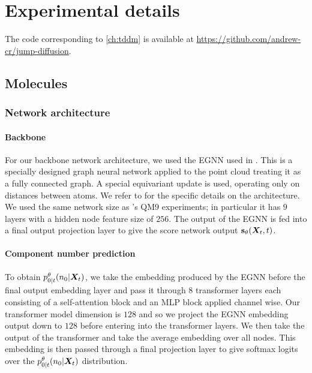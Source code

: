 \section{Experimental details}
\label{sec:tddm-ExperimentDetails}
The code corresponding to \cref{ch:tddm} is available at \url{https://github.com/andrew-cr/jump-diffusion}.

\subsection{Molecules}

\subsubsection{Network architecture}
\paragraph{Backbone}
For our backbone network architecture, we used the EGNN used in \citet{hoogeboom2022equivariant}. This is a specially designed graph neural network applied to the point cloud treating it as a fully connected graph. A special equivariant update is used, operating only on distances between atoms. We refer to \citet{hoogeboom2022equivariant} for the specific details on the architecture. We used the same network size as \citet{hoogeboom2022equivariant}'s QM9 experiments; in particular it has $9$ layers with a hidden node feature size of $256$. The output of the EGNN is fed into a final output projection layer to give the score network output ${\mathbf{s}}_\theta({\bm{X}}_t, t)$.

\paragraph{Component number prediction}
To obtain $p_{0|t}^\theta(n_0 | {\bm{X}}_t)$,  we take the embedding produced by the EGNN before the final output embedding layer and pass it through 8 transformer layers each consisting of a self-attention block and an MLP block applied channel wise. Our transformer model dimension is $128$ and so we project the EGNN embedding output down to $128$ before entering into the transformer layers. We then take the output of the transformer and take the average embedding over all nodes. This embedding is then passed through a final projection layer to give softmax logits over the $p_{0|t}^\theta(n_0 | {\bm{X}}_t)$ distribution.

